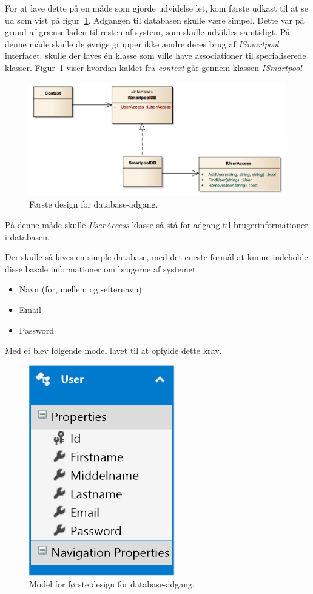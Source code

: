 For at lave dette på en måde som gjorde udvidelse let, kom første udkast til at se ud som vist på figur~\ref{fig:database_class_1}. Adgangen til databasen skulle være simpel. Dette var på grund af grænsefladen til resten af system, som skulle udvikles samtidigt. På denne måde skulle de øvrige grupper ikke ændre deres brug af \textit{ISmartpool} interfacet.  skulle der laves én klasse som ville have associationer til specialiserede klasser. Figur~\ref{fig:database_class_1} viser hvordan kaldet fra \textit{context} går gennem klassen \textit{ISmartpool}

\begin{figure}[h]
	\centering
	\includegraphics[width=0.9\linewidth]{figs/design/database_class_1}
	\caption{Første design for database-adgang.}
	\label{fig:database_class_1}
\end{figure}

På denne måde skulle \textit{UserAccess} klasse så stå for adgang til brugerinformationer i databasen. 

Der skulle så laves en simple database, med det eneste formål at kunne indeholde disse basale informationer om brugerne af systemet.

\begin{itemize}
	\item Navn (for, mellem og -efternavn)
	\item Email
	\item Password
\end{itemize}

Med \gls{ef} blev følgende model lavet til at opfylde dette krav.

\begin{figure}[h]
	\centering
	\includegraphics[width=0.25\linewidth]{figs/design/database_model_1}
	\caption{Model for første design for database-adgang.}
	\label{fig:database_model_1}
\end{figure}

